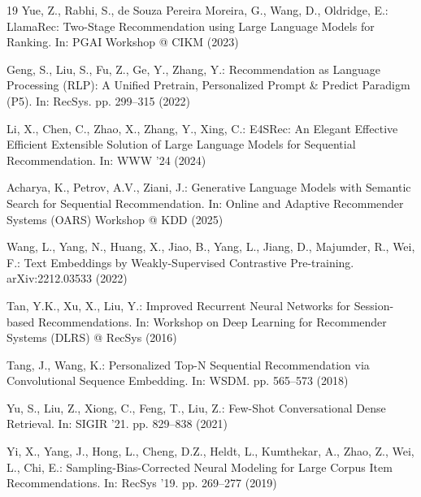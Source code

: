\documentclass[runningheads]{llncs}
\begin{document}
\begin{thebibliography}{19}
Yue, Z., Rabhi, S., de Souza Pereira Moreira, G., Wang, D., Oldridge, E.: LlamaRec: Two-Stage
Recommendation using Large Language Models for Ranking. In: PGAI Workshop @ CIKM (2023)

Geng, S., Liu, S., Fu, Z., Ge, Y., Zhang, Y.: Recommendation as Language Processing (RLP): A
Unified Pretrain, Personalized Prompt \& Predict Paradigm (P5). In: RecSys. pp. 299--315 (2022)

Li, X., Chen, C., Zhao, X., Zhang, Y., Xing, C.: E4SRec: An Elegant Effective Efficient Extensible
Solution of Large Language Models for Sequential Recommendation. In: WWW '24 (2024)

Acharya, K., Petrov, A.V., Ziani, J.: Generative Language Models with Semantic Search for
Sequential Recommendation. In: Online and Adaptive Recommender Systems (OARS) Workshop @ KDD
(2025)

Wang, L., Yang, N., Huang, X., Jiao, B., Yang, L., Jiang, D., Majumder, R., Wei, F.: Text
Embeddings by Weakly-Supervised Contrastive Pre-training. arXiv:2212.03533 (2022)

Tan, Y.K., Xu, X., Liu, Y.: Improved Recurrent Neural Networks for Session-based Recommendations.
In: Workshop on Deep Learning for Recommender Systems (DLRS) @ RecSys (2016)

Tang, J., Wang, K.: Personalized Top-N Sequential Recommendation via Convolutional Sequence
Embedding. In: WSDM. pp. 565--573 (2018)

Yu, S., Liu, Z., Xiong, C., Feng, T., Liu, Z.: Few-Shot Conversational Dense Retrieval. In: SIGIR
'21. pp. 829--838 (2021)

Yi, X., Yang, J., Hong, L., Cheng, D.Z., Heldt, L., Kumthekar, A., Zhao, Z., Wei, L., Chi, E.:
Sampling-Bias-Corrected Neural Modeling for Large Corpus Item Recommendations. In: RecSys '19. pp.
269--277 (2019)

\end{thebibliography}
\end{document}
